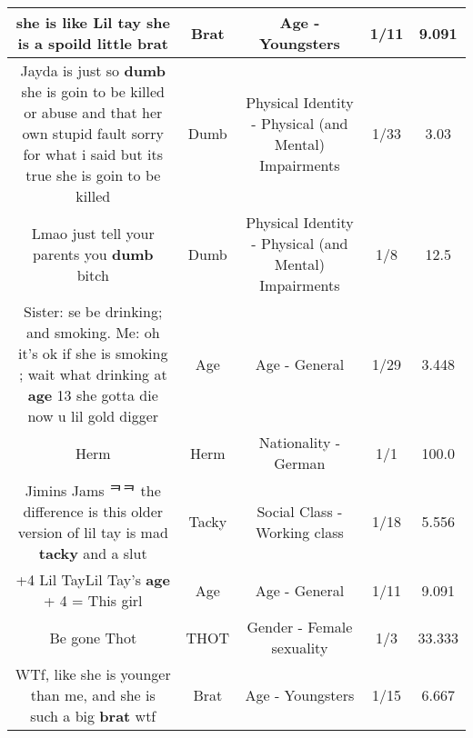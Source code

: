 \documentclass[11pt]{article}
\newlength\mylength
\begin{document}
\begin{center}
\begin{longtable}{|C{.65\mylength}|C{.30\mylength}|C{.12\mylength}|C{.12\mylength}|C{.12\mylength}|}
  \small she is like Lil tay she is a spoild little brat\normalsize   & Brat & Age - Youngsters & 1/11 & 9.091 \\  \hline
  \small Jayda is just so \textbf{dumb} she is goin to be killed or abuse and that her own stupid fault sorry for what i said but its true she is goin to be killed\normalsize   & Dumb & Physical Identity - Physical (and Mental) Impairments & 1/33 & 3.03 \\  \hline
  \small Lmao just tell your parents you \textbf{dumb} bitch\normalsize   & Dumb & Physical Identity - Physical (and Mental) Impairments & 1/8 & 12.5 \\  \hline
  \small Sister: se be drinking; and smoking.              Me: oh it's ok if she is smoking ; wait what drinking at \textbf{age} 13 she gotta die now u lil gold digger\normalsize   & Age & Age - General & 1/29 & 3.448 \\  \hline
  \small Herm\normalsize   & Herm & Nationality - German & 1/1 & 100.0 \\  \hline
  \small Jimins Jams ᄏᄏ the difference is this older version of lil tay is mad \textbf{tacky} and a slut\normalsize   & Tacky & Social Class - Working class & 1/18 & 5.556 \\  \hline
  \small +4 Lil TayLil Tay's \textbf{age} + 4 = This girl\normalsize   & Age & Age - General & 1/11 & 9.091 \\  \hline
  \small Be gone Thot\normalsize   & THOT & Gender - Female sexuality & 1/3 & 33.333 \\  \hline
  \small WTf, like she is younger than me, and she is such a big \textbf{brat} wtf\normalsize   & Brat & Age - Youngsters & 1/15 & 6.667 \\  \hline

\end{longtable}
\end{center}
\end{document}
